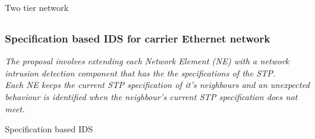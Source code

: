 \documentclass[10pt, blue,subsection=true, compress]{beamer}
\begin{document}
\begin{frame}
\begin{center}
\begin{block}{Two tier network}
\end{block}
\end{center}

\end{frame} 

 \subsection*{}
\begin{frame} \frametitle{Specification based IDS for carrier Ethernet network }
\emph{The proposal involves extending each Network Element \textit{(NE)} with a network \textit{intrusion detection component} that has the the \textit{specifications} of the STP. }\\

\emph{Each NE keeps the current STP specification of it's neighbours and an unexpected behaviour is identified when the neighbour's current STP specification does not meet.}
\begin{center}
\begin{block} {Specification based IDS}
\begin{flushright}


\end{flushright}
\end{block}
\end{center}
\end{frame}
\end{document}
